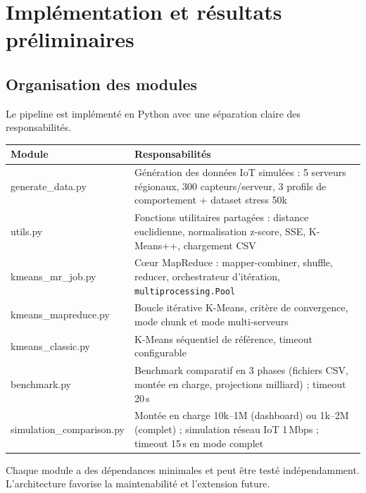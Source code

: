 \documentclass[12pt,a4paper]{article}
\begin{document}
\section{Implémentation et résultats préliminaires}

\subsection{Organisation des modules}

Le pipeline est implémenté en Python avec une séparation claire des responsabilités.

\begin{center}
\small
\begin{tabular}{>{\ttfamily}l p{8.5cm}}
\toprule
\normalfont\textbf{Module} & \textbf{Responsabilités} \\
\midrule
\normalfont generate\_data.py & Génération des données IoT simulées : 5 serveurs
  régionaux, 300 capteurs/serveur, 3 profils de comportement + dataset stress 50k \\[2pt]
\normalfont utils.py       & Fonctions utilitaires partagées : distance euclidienne,
  normalisation z-score, SSE, K-Means++, chargement CSV \\[2pt]
\normalfont kmeans\_mr\_job.py & Cœur MapReduce : mapper-combiner, shuffle, reducer,
  orchestrateur d'itération, \texttt{multiprocessing.Pool} \\[2pt]
\normalfont kmeans\_mapreduce.py & Boucle itérative K-Means, critère de convergence,
  mode chunk et mode multi-serveurs \\[2pt]
\normalfont kmeans\_classic.py & K-Means séquentiel de référence, timeout configurable \\[2pt]
\normalfont benchmark.py & Benchmark comparatif en 3 phases (fichiers CSV, montée en charge, projections milliard) ; timeout 20\,s \\[2pt]
\normalfont simulation\_comparison.py & Montée en charge 10k–1M (dashboard) ou 1k–2M
  (complet) ; simulation réseau IoT 1\,Mbps ; timeout 15\,s en mode complet \\
\bottomrule
\end{tabular}
\end{center}

\noindent Chaque module a des dépendances minimales et peut être testé indépendamment.
L'architecture favorise la maintenabilité et l'extension future.
\end{document}
